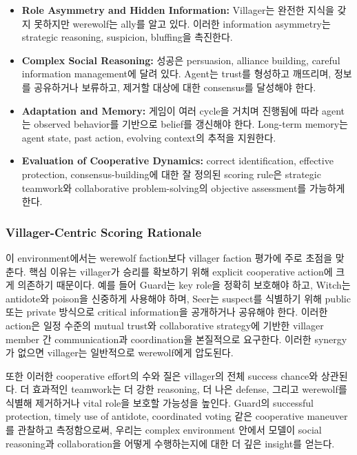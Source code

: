 \begin{itemize}
    \item \textbf{Role Asymmetry and Hidden Information:} Villager는 완전한 지식을 갖지 못하지만 werewolf는 ally를 알고 있다. 이러한 information asymmetry는 strategic reasoning, suspicion, bluffing을 촉진한다.
    \item \textbf{Complex Social Reasoning:} 성공은 persuasion, alliance building, careful information management에 달려 있다. Agent는 trust를 형성하고 깨뜨리며, 정보를 공유하거나 보류하고, 제거할 대상에 대한 consensus를 달성해야 한다.
    \item \textbf{Adaptation and Memory:} 게임이 여러 cycle을 거치며 진행됨에 따라 agent는 observed behavior를 기반으로 belief를 갱신해야 한다. Long-term memory는 agent state, past action, evolving context의 추적을 지원한다.
    \item \textbf{Evaluation of Cooperative Dynamics:} correct identification, effective protection, consensus-building에 대한 잘 정의된 scoring rule은 strategic teamwork와 collaborative problem-solving의 objective assessment를 가능하게 한다.
\end{itemize}

\subsubsection{Villager-Centric Scoring Rationale}

이 environment에서는 werewolf faction보다 villager faction 평가에 주로 초점을 맞춘다. 핵심 이유는 villager가 승리를 확보하기 위해 explicit cooperative action에 크게 의존하기 때문이다. 예를 들어 Guard는 key role을 정확히 보호해야 하고, Witch는 antidote와 poison을 신중하게 사용해야 하며, Seer는 suspect를 식별하기 위해 public 또는 private 방식으로 critical information을 공개하거나 공유해야 한다. 이러한 action은 일정 수준의 mutual trust와 collaborative strategy에 기반한 villager member 간 communication과 coordination을 본질적으로 요구한다. 이러한 synergy가 없으면 villager는 일반적으로 werewolf에게 압도된다.

또한 이러한 cooperative effort의 수와 질은 villager의 전체 success chance와 상관된다. 더 효과적인 teamwork는 더 강한 reasoning, 더 나은 defense, 그리고 werewolf를 식별해 제거하거나 vital role을 보호할 가능성을 높인다. Guard의 successful protection, timely use of antidote, coordinated voting 같은 cooperative maneuver를 관찰하고 측정함으로써, 우리는 complex environment 안에서 모델이 social reasoning과 collaboration을 어떻게 수행하는지에 대한 더 깊은 insight를 얻는다.

